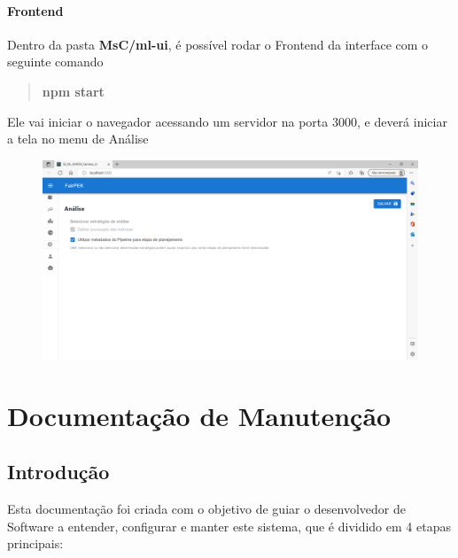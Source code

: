 \documentclass[portugues]{ic-tese}
\begin{document}
\subsubsection{Frontend}

Dentro da pasta \textbf{MsC/ml-ui}, é possível rodar o Frontend da interface com o seguinte comando

\begin{quote}\textbf{npm start}\end{quote}

Ele vai iniciar o navegador acessando um servidor na porta 3000, e deverá iniciar a tela no menu de Análise

\begin{figure}[H]
\centering
\includegraphics[scale=0.2]{images/doc-install/ml-ui.png}
\label{fig:DocInstallMLUI}
\end{figure}

\chapter{Documentação de Manutenção}
\label{ann:DocMain}

\section{Introdução}

Esta documentação foi criada com o objetivo de guiar o desenvolvedor de Software a entender, configurar e manter este sistema, que é dividido em 4 etapas principais:
\end{document}
